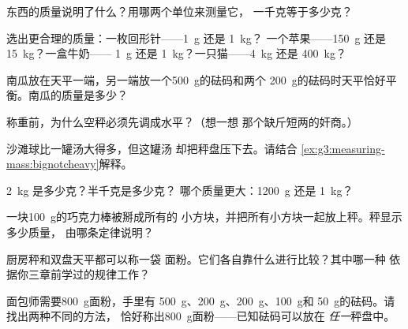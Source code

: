 \begin{exercise}[$\star$]\label{exo:g3:measuring-mass:1}
东西的质量说明了什么？用哪两个单位来测量它，
一千克等于多少克？
\end{exercise}

\begin{exercise}[$\star$]\label{exo:g3:measuring-mass:2}
选出更合理的质量：一枚回形针——\qty{1}{g} 还是 \qty{1}{kg}？
一个苹果——\qty{150}{g} 还是 \qty{15}{kg}？一盒牛奶——
\qty{1}{g} 还是 \qty{1}{kg}？一只猫——\qty{4}{kg} 还是 \qty{400}{kg}？
\end{exercise}

\begin{exercise}[$\star$]\label{exo:g3:measuring-mass:3}
南瓜放在天平一端，另一端放一个\qty{500}{g}的砝码和两个
\qty{200}{g}的砝码时天平恰好平衡。南瓜的质量是多少？
\end{exercise}

\begin{exercise}[$\star$]\label{exo:g3:measuring-mass:4}
称重前，为什么空秤必须先调成水平？（想一想
那个缺斤短两的奸商。）
\end{exercise}

\begin{exercise}[$\star$]\label{exo:g3:measuring-mass:5}
沙滩球比一罐汤大得多，但这罐汤
却把秤盘压下去。请结合
\cref{ex:g3:measuring-mass:bignotcheavy}解释。
\end{exercise}

\begin{exercise}[$\star$]\label{exo:g3:measuring-mass:6}
\qty{2}{kg} 是多少克？半千克是多少克？
哪个质量更大：\qty{1200}{g} 还是 \qty{1}{kg}？
\end{exercise}

\begin{exercise}[$\star$]\label{exo:g3:measuring-mass:7}
一块\qty{100}{g}的巧克力棒被掰成所有的
小方块，并把所有小方块一起放上秤。秤显示多少质量，
由哪条定律说明？
\end{exercise}

\begin{exercise}[$\star$]\label{exo:g3:measuring-mass:8}
厨房秤和双盘天平都可以称一袋
面粉。它们各自靠什么进行比较？其中哪一种
依据你三章前学过的规律工作？
\end{exercise}

\begin{exercise}[$\star$]\label{exo:g3:measuring-mass:9}
面包师需要\qty{800}{g}面粉，手里有
\qty{500}{g}、\qty{200}{g}、\qty{200}{g}、\qty{100}{g}和
\qty{50}{g}的砝码。请找出两种不同的方法，
恰好称出\qty{800}{g}面粉——已知砝码可以放在
\emph{任一}秤盘中。
\end{exercise}


